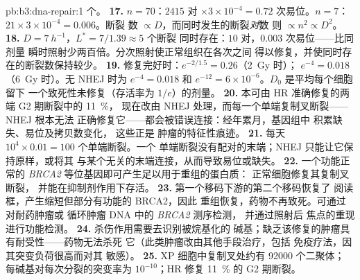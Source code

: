 \begin{solution}{pb:b3:dna-repair:1}
个。
\textbf{17.} $n = 70$：$2415$ 对 $\times 3\times 10^{-4} = 0.72$
次易位。$n = 7$：$21\times 3\times 10^{-4} = 0.006$。断裂
数 $\propto D$，而同时发生的断裂\emph{对}数
则 $\propto n^{2} \propto D^{2}$。
\textbf{18.} $D = \qty{7}{h^{-1}}$，$L^{*} = 7/1.39 \approx 5$ 个断裂
同时存在：$10$ 对，$0.003$ 次易位——比同剂量
瞬时照射少两百倍。分次照射使正常组织在各次之间
得以修复，并使同时存在的断裂数保持较少。
\textbf{19.} 修复完好时：$e^{-2/1.5} = 0.26$（\qty{2}{Gy} 时）；
$e^{-4} = 0.018$（\qty{6}{Gy} 时）。无 NHEJ 时为 $e^{-4} = 0.018$ 和
$e^{-12} = 6\times 10^{-6}$。$D_{0}$ 是平均每个细胞留下
一个致死性未修复（存活率为 $1/e$）的剂量。
\textbf{20.} 本可由 HR 准确修复的两端 G2 期断裂中的 \qty{11}{\%}，
现在改由 NHEJ 处理，而每一个单端复制叉断裂——NHEJ 根本无法
正确修复它——都会被错误连接：经年累月，基因组中
积累缺失、易位及拷贝数变化，
这些正是 \emph{} 肿瘤的特征性痕迹。
\textbf{21.} 每天 $10^{4}\times 0.01 = 100$ 个单端断裂。一个
单端断裂没有配对的末端；NHEJ 只能让它保持原样，或将其
与某个无关的末端连接，从而导致易位或缺失。
\textbf{22.} 一个功能正常的 \emph{BRCA2} 等位基因即可产生足以用于重组的蛋白质：
正常细胞修复其复制叉断裂，
并能在抑制剂作用下存活。
\textbf{23.} 第一个移码下游的第二个移码恢复了
阅读框，产生缩短但部分有功能的 BRCA2，因此
重组恢复，药物不再致死。可通过对耐药肿瘤或
循环肿瘤 DNA 中的 \emph{BRCA2} 测序检测，
并通过照射后  焦点的重现
进行功能检测。
\textbf{24.} 杀伤作用需要去识别被烷基化的
碱基；缺乏该修复的肿瘤具有耐受性——药物无法杀死
它（此类肿瘤改由其他手段治疗，包括
免疫疗法，因其突变负荷很高而对其
敏感）。
\textbf{25.} XP 细胞中复制叉处约有 \num{92000} 个二聚体；
每碱基对每次分裂的突变率为 $10^{-10}$；HR 修复
\qty{11}{\%} 的 G2 期断裂。
\end{solution}
